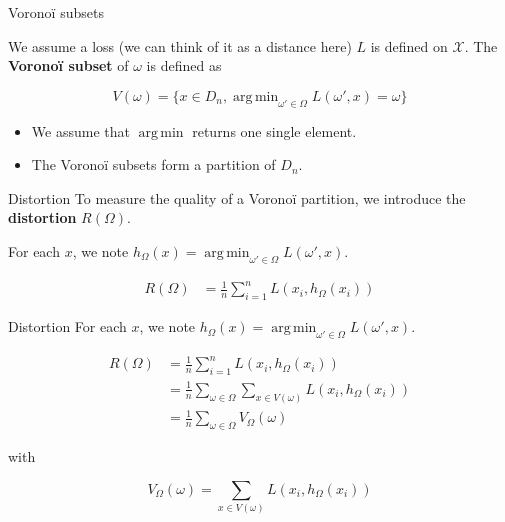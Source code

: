 \documentclass[usenames,dvipsnames]{beamer}
\DeclareMathOperator*{\argmin}{arg\,min}
\begin{document}
\begin{frame}{Voronoï subsets}

    We assume a loss (we can think of it as a distance here) $L$ is defined on $ \mathcal{X} $. The \textbf{Voronoï subset} of $\omega$ is defined as
    
    \begin{equation}
	V(\omega) = \{x\in D_n, \argmin_{\omega'\in \Omega}L(\omega', x)=\omega \}
    \end{equation}
    \begin{itemize}
        \item We assume that $ \argmin$ returns one single element.
	\item The Voronoï subsets form a partition of $D_n$.
    \end{itemize}
\end{frame}

\begin{frame}{Distortion}
    To measure the quality of a Voronoï partition, we introduce the \textbf{{distortion}} $R(\Omega)$.

    For each $x$, we note $h_{\Omega}(x)= \argmin_{\omega'\in \Omega}L(\omega', x)$.

    \begin{equation}
        \begin{aligned}
            \label{eq:}
	    R(\Omega)&= \frac{1}{n} \sum^{n}_{i=1}  L(x_i, h_{\Omega}(x_i))
        \end{aligned}
    \end{equation}
\end{frame}

\begin{frame}{Distortion}
    For each $x$, we note $h_{\Omega}(x)= \argmin_{\omega'\in \Omega}L(\omega', x)$.

    \begin{equation}
        \begin{aligned}
            \label{eq:}
	    R(\Omega)&= \frac{1}{n} \sum^{n}_{i=1}  L(x_i, h_{\Omega}(x_i))\\
	    &= \frac{1}{n} \sum_{\omega\in \Omega} \sum_{x\in V(\omega)}  L(x_i, h_{\Omega}(x_i))\\
	    &= \frac{1}{n} \sum_{\omega\in \Omega} V_{\Omega}(\omega)
        \end{aligned}
    \end{equation}

    with

    \begin{equation}
        V_{\Omega}(\omega)= \sum_{x\in V(\omega)}  L(x_i, h_{\Omega}(x_i))
    \end{equation}
\end{frame}
\end{document}
